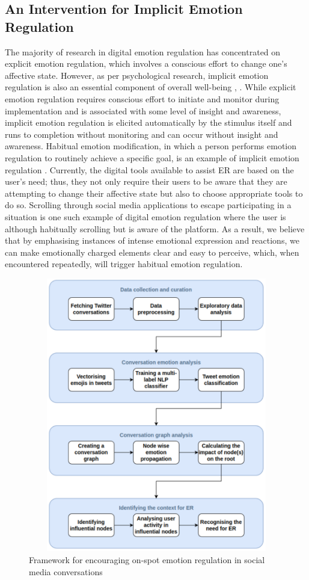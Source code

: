 \subsection{An Intervention for Implicit Emotion Regulation}
The majority of research in digital emotion regulation has concentrated on explicit emotion regulation, which involves a conscious effort to change one's affective state. However, as per psychological research, implicit emotion regulation is also an essential component of overall well-being \cite{gyurak2011explicit}, \cite{braunstein2017explicit}. While explicit emotion regulation requires conscious effort to initiate and monitor during implementation and is associated with some level of insight and awareness, implicit emotion regulation is elicited automatically by the stimulus itself and runs to completion without monitoring and can occur without insight and awareness. Habitual emotion modification, in which a person performs emotion regulation to routinely achieve a specific goal, is an example of implicit emotion regulation \cite{gross2006emotion}. 
Currently, the digital tools available to assist ER are based on the user's need; thus, they not only require their users to be aware that they are attempting to change their affective state but also to choose appropriate tools to do so. Scrolling through social media applications to escape participating in a situation is one such example of digital emotion regulation where the user is although habitually scrolling but is aware of the platform. As a result, we believe that by emphasising instances of intense emotional expression and reactions, we can make emotionally charged elements clear and easy to perceive, which, when encountered repeatedly, will trigger habitual emotion regulation.
\begin{figure}[h]
  
    \centering
    \includegraphics[width=12cm,height=12cm,keepaspectratio]{eimpact.pdf}
  \caption{Framework for encouraging on-spot emotion regulation in social media conversations}
  \label{fig:Framework}
  \end{figure} 
